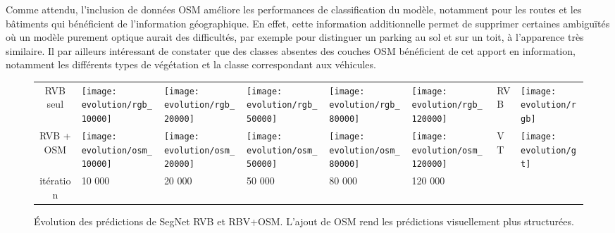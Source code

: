 Comme attendu, l'inclusion de données OSM améliore les performances de classification du modèle, notamment pour les routes et les bâtiments qui bénéficient de l'information géographique. En effet, cette information additionnelle permet de supprimer certaines ambiguïtés où un modèle purement optique aurait des difficultés, par exemple pour distinguer un parking au sol et sur un toit, à l'apparence très similaire. Il par ailleurs intéressant de constater que des classes absentes des couches \gls{OSM} bénéficient de cet apport en information, notamment les différents types de végétation et la classe correspondant aux véhicules.

\begin{figure}
\centering
\begin{tabularx}{0.95\textwidth}{c Y Y Y Y Y Y Y}
RVB seul &
\texttt{[image: evolution/rgb\_10000]} &
\texttt{[image: evolution/rgb\_20000]} &
\texttt{[image: evolution/rgb\_50000]} &
\texttt{[image: evolution/rgb\_80000]} &
\texttt{[image: evolution/rgb\_120000]} &
RVB &
\texttt{[image: evolution/rgb]} \\
RVB + OSM &
\texttt{[image: evolution/osm\_10000]} &
\texttt{[image: evolution/osm\_20000]} &
\texttt{[image: evolution/osm\_50000]} &
\texttt{[image: evolution/osm\_80000]} &
\texttt{[image: evolution/osm\_120000]} &
VT &
\texttt{[image: evolution/gt]} \\
itération & 10 000 & 20 000 & 50 000 & 80 000 & 120 000\\
\end{tabularx}
\caption{Évolution des prédictions de SegNet RVB et RBV+OSM. L'ajout de OSM rend les prédictions visuellement plus structurées.\\
\isprslegende}
\label{fig:training_evolution}
\end{figure}

